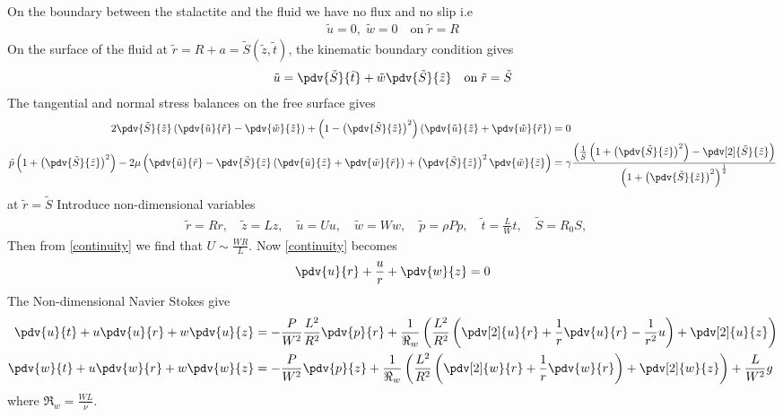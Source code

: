 \documentclass[12pt]{article}
\begin{document}
On the boundary between the stalactite and the fluid we have no flux and no slip i.e
\begin{align}
  \tilde u=0,\;\tilde  w=0\quad\mathrm{on}\; \tilde r=R \label{solidboundary}
\end{align}
On the surface of the fluid at $\tilde r=R+a=\tilde S(\tilde z,\tilde t)$, the kinematic boundary condition gives
\begin{align}
 \tilde   u=\pdv{\tilde S}{\tilde t}+\tilde w\pdv{\tilde S}{\tilde z} \quad\mathrm{on}\;\tilde  r=\tilde S \label{kinematic}
\end{align}
The tangential and normal stress balances on the free surface gives
\footnotesize
\begin{align}
2\pdv{\tilde S}{\tilde z}\left(\pdv{\tilde u}{\tilde r}-\pdv{\tilde w}{\tilde z}\right)+\left(1-\left(\pdv{\tilde S}{\tilde z}\right)^2\right)\left(\pdv{\tilde u}{\tilde z}+\pdv{\tilde w}{\tilde r}\right)&=0\label{tangstress}\\
  \tilde p\left(1+\left(\pdv{\tilde S}{\tilde z}\right)^2\right)-2\mu\left( \pdv{\tilde u}{\tilde r}-\pdv{\tilde S}{\tilde z}\left(\pdv{\tilde u}{\tilde z}+\pdv{\tilde w}{\tilde r}\right)+\left(\pdv{\tilde S}{\tilde z}\right)^2\pdv{\tilde w}{\tilde z}\right)&=\gamma\frac{\left(\frac{1}{\tilde S}\left(1+\left(\pdv{\tilde S}{\tilde z}\right)^2\right)-\pdv[2]{\tilde S}{\tilde z}\right)}{\left(1+\left(\pdv{\tilde S}{\tilde z}\right)^2\right)^{\frac{1}{2}}}\label{normstress}
  \end{align}
  \normalsize
  at $\tilde r= \tilde{S}$
Introduce non-dimensional variables
\small
\begin{align}
  \tilde r=Rr, \quad \tilde z=Lz, \quad\tilde  u=Uu, \quad \tilde w=Ww, \quad \tilde p=\rho Pp, \quad\tilde  t=\frac{L}{W}t,\quad \tilde S=R_0S,\quad 
\end{align}
\normalsize
Then from \eqref{continuity} we find that $U\sim \frac{WR}{L}$.
Now \eqref{continuity} becomes
\begin{align}
\pdv{ u}{ r}+\frac{ u}{ r}+\pdv{ w}{ z}=0 \label{continuityn}
\end{align}
The Non-dimensional Navier Stokes give
\begin{align}
  \pdv{ u}{ t}+ u\pdv{ u}{ r}+ w\pdv{ u}{ z}&=-\frac{P}{W^2}\frac{L^2}{{R}^2}\pdv{ p}{ r}+\frac{1}{\Re_w}\left(\frac{L^2}{{R}^2}\left(\pdv[2]{ u}{ r}+\frac{1}{ r}\pdv{ u}{ r}-\frac{1}{r^2} u\right)+\pdv[2]{ u}{ z}\right)\label{navierrn}\\
\pdv{ w}{ t}+u\pdv{ w}{ r}+ w\pdv{ w}{ z}&=-\frac{P}{W^2}\pdv{ p}{ z}+\frac{1}{\Re_w}\left(\frac{L^2}{{R}^2}\left(\pdv[2]{ w}{ r}+\frac{1}{ r}\pdv{ w}{ r}\right)+\pdv[2]{ w}{ z}\right)+ \frac{L}{W^2}g \label{naviervn}
\end{align}
where $\Re_w=\frac{WL}{\nu}$. 
\end{document}
